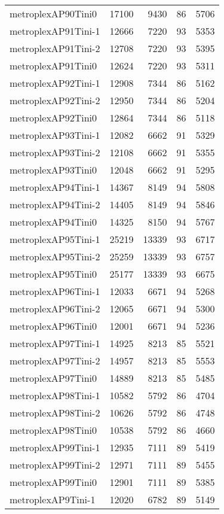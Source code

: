 \documentclass[../../../thesis.tex]{subfiles}
\begin{document}
\begin{longtable}{lrrrr}
metroplexAP90Tini0 & 17100 & 9430 & 86 & 5706 \\
metroplexAP91Tini-1 & 12666 & 7220 & 93 & 5353 \\
metroplexAP91Tini-2 & 12708 & 7220 & 93 & 5395 \\
metroplexAP91Tini0 & 12624 & 7220 & 93 & 5311 \\
metroplexAP92Tini-1 & 12908 & 7344 & 86 & 5162 \\
metroplexAP92Tini-2 & 12950 & 7344 & 86 & 5204 \\
metroplexAP92Tini0 & 12864 & 7344 & 86 & 5118 \\
metroplexAP93Tini-1 & 12082 & 6662 & 91 & 5329 \\
metroplexAP93Tini-2 & 12108 & 6662 & 91 & 5355 \\
metroplexAP93Tini0 & 12048 & 6662 & 91 & 5295 \\
metroplexAP94Tini-1 & 14367 & 8149 & 94 & 5808 \\
metroplexAP94Tini-2 & 14405 & 8149 & 94 & 5846 \\
metroplexAP94Tini0 & 14325 & 8150 & 94 & 5767 \\
metroplexAP95Tini-1 & 25219 & 13339 & 93 & 6717 \\
metroplexAP95Tini-2 & 25259 & 13339 & 93 & 6757 \\
metroplexAP95Tini0 & 25177 & 13339 & 93 & 6675 \\
metroplexAP96Tini-1 & 12033 & 6671 & 94 & 5268 \\
metroplexAP96Tini-2 & 12065 & 6671 & 94 & 5300 \\
metroplexAP96Tini0 & 12001 & 6671 & 94 & 5236 \\
metroplexAP97Tini-1 & 14925 & 8213 & 85 & 5521 \\
metroplexAP97Tini-2 & 14957 & 8213 & 85 & 5553 \\
metroplexAP97Tini0 & 14889 & 8213 & 85 & 5485 \\
metroplexAP98Tini-1 & 10582 & 5792 & 86 & 4704 \\
metroplexAP98Tini-2 & 10626 & 5792 & 86 & 4748 \\
metroplexAP98Tini0 & 10538 & 5792 & 86 & 4660 \\
metroplexAP99Tini-1 & 12935 & 7111 & 89 & 5419 \\
metroplexAP99Tini-2 & 12971 & 7111 & 89 & 5455 \\
metroplexAP99Tini0 & 12901 & 7111 & 89 & 5385 \\
metroplexAP9Tini-1 & 12020 & 6782 & 89 & 5149 \\

\end{longtable}
\end{document}
